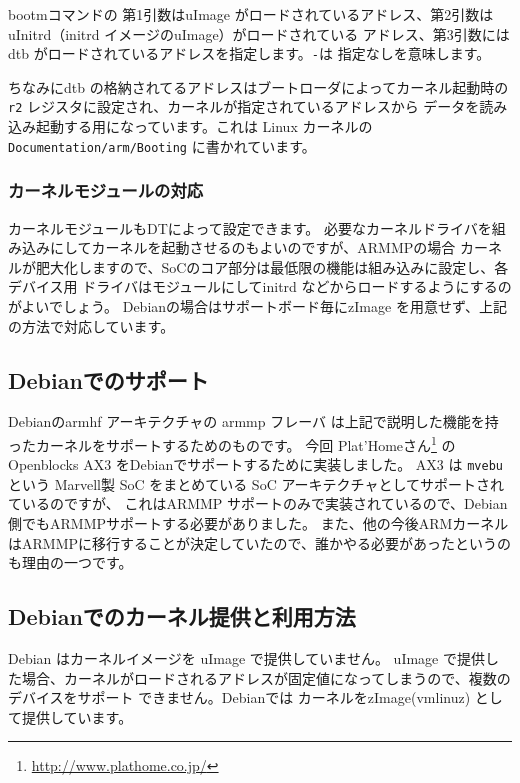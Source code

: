 \documentclass[mingoth,a4paper]{jsarticle}
\begin{document}
\begin{enumerate}

bootmコマンドの 第1引数はuImage がロードされているアドレス、第2引数は uInitrd（initrd イメージのuImage）がロードされている
アドレス、第3引数には dtb がロードされているアドレスを指定します。\texttt{-}は 指定なしを意味します。

ちなみにdtb の格納されてるアドレスはブートローダによってカーネル起動時の \texttt{r2} レジスタに設定され、カーネルが指定されているアドレスから
データを読み込み起動する用になっています。これは Linux カーネルの \texttt{Documentation/arm/Booting} に書かれています。

\end{enumerate}

\subsubsection{カーネルモジュールの対応}

カーネルモジュールもDTによって設定できます。
必要なカーネルドライバを組み込みにしてカーネルを起動させるのもよいのですが、ARMMPの場合
カーネルが肥大化しますので、SoCのコア部分は最低限の機能は組み込みに設定し、各デバイス用
ドライバはモジュールにしてinitrd などからロードするようにするのがよいでしょう。
Debianの場合はサポートボード毎にzImage を用意せず、上記の方法で対応しています。

\subsection{Debianでのサポート}

Debianのarmhf アーキテクチャの armmp フレーバ は上記で説明した機能を持ったカーネルをサポートするためのものです。
今回 Plat'Homeさん\footnote{\url{http://www.plathome.co.jp/}}
の Openblocks AX3 をDebianでサポートするために実装しました。
AX3 は \texttt{mvebu} という Marvell製 SoC をまとめている SoC アーキテクチャとしてサポートされているのですが、
これはARMMP サポートのみで実装されているので、Debian側でもARMMPサポートする必要がありました。
また、他の今後ARMカーネルはARMMPに移行することが決定していたので、誰かやる必要があったというのも理由の一つです。

\subsection{Debianでのカーネル提供と利用方法}
Debian はカーネルイメージを uImage で提供していません。
uImage で提供した場合、カーネルがロードされるアドレスが固定値になってしまうので、複数のデバイスをサポート
できません。Debianでは カーネルをzImage(vmlinuz) として提供しています。
\end{document}

